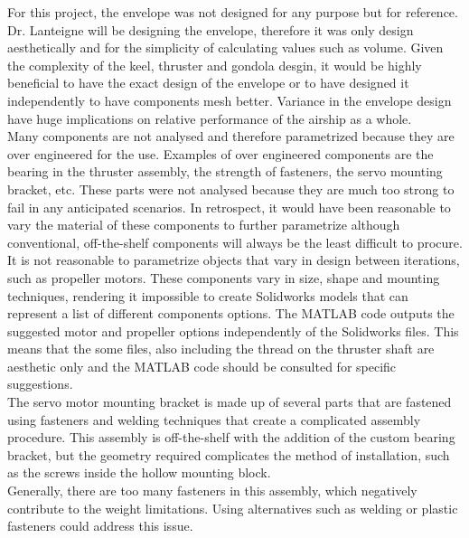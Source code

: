 \documentclass[../main.tex]{subfiles}
\begin{document}
For this project, the envelope was not designed for any purpose but for reference. Dr. Lanteigne will be designing the envelope, therefore it was only design aesthetically and for the simplicity of calculating values such as volume. Given the complexity of the keel, thruster and gondola desgin, it would be highly beneficial to have the exact design of the envelope or to have designed it independently to have components mesh better. Variance in the envelope design have huge implications on relative performance of the airship as a whole.\\

Many components are not analysed and therefore parametrized because they are over engineered for the use. Examples of over engineered components are the bearing in the thruster assembly, the strength of fasteners, the servo mounting bracket, etc. These parts were not analysed because they are much too strong to fail in any anticipated scenarios. In retrospect, it would have been reasonable to vary the material of these components to further parametrize although conventional, off-the-shelf components will always be the least difficult to procure.\\

It is not reasonable to parametrize objects that vary in design between iterations, such as propeller motors. These components vary in size, shape and mounting techniques, rendering it impossible to create Solidworks models that can represent a list of different components options. The MATLAB code outputs the suggested motor and propeller options independently of the Solidworks files. This means that the some files, also including the thread on the thruster shaft are aesthetic only and the MATLAB code should be consulted for specific suggestions.\\

The servo motor mounting bracket is made up of several parts that are fastened using fasteners and welding techniques that create a complicated assembly procedure. This assembly is off-the-shelf with the addition of the custom bearing bracket, but the geometry required complicates the method of installation, such as the screws inside the hollow mounting block.\\

Generally, there are too many fasteners in this assembly, which negatively contribute to the weight limitations. Using alternatives such as welding or plastic fasteners could address this issue. \\
\end{document}
